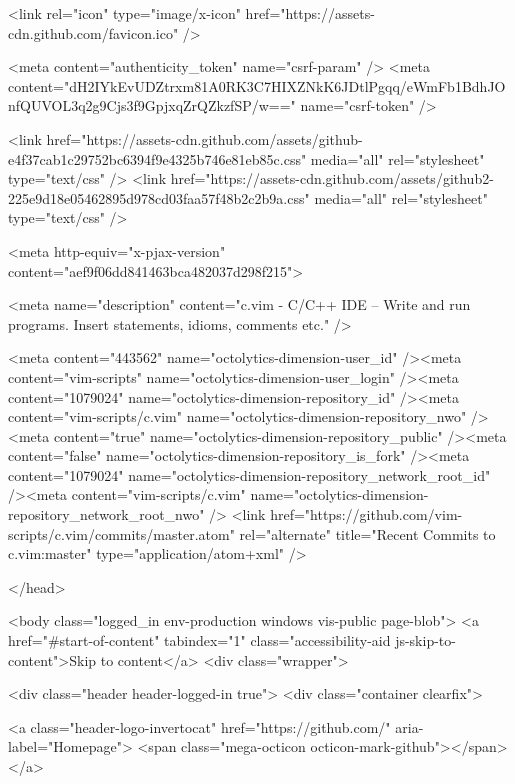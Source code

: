     
    
    <link rel="icon" type="image/x-icon" href="https://assets-cdn.github.com/favicon.ico" />


    <meta content="authenticity_token" name="csrf-param" />
<meta content="dH2IYkEvUDZtrxm81A0RK3C7HIXZNkK6JDtlPgqq/eWmFb1BdhJOnfQUVOL3q2g9Cjs3f9GpjxqZrQZkzfSP/w==" name="csrf-token" />

    <link href="https://assets-cdn.github.com/assets/github-e4f37cab1c29752bc6394f9e4325b746e81eb85c.css" media="all" rel="stylesheet" type="text/css" />
    <link href="https://assets-cdn.github.com/assets/github2-225e9d18e05462895d978cd03faa57f48b2c2b9a.css" media="all" rel="stylesheet" type="text/css" />
    


    <meta http-equiv="x-pjax-version" content="aef9f06dd841463bca482037d298f215">

      
  <meta name="description" content="c.vim - C/C++ IDE --  Write and run programs. Insert statements, idioms, comments etc." />


  <meta content="443562" name="octolytics-dimension-user_id" /><meta content="vim-scripts" name="octolytics-dimension-user_login" /><meta content="1079024" name="octolytics-dimension-repository_id" /><meta content="vim-scripts/c.vim" name="octolytics-dimension-repository_nwo" /><meta content="true" name="octolytics-dimension-repository_public" /><meta content="false" name="octolytics-dimension-repository_is_fork" /><meta content="1079024" name="octolytics-dimension-repository_network_root_id" /><meta content="vim-scripts/c.vim" name="octolytics-dimension-repository_network_root_nwo" />
  <link href="https://github.com/vim-scripts/c.vim/commits/master.atom" rel="alternate" title="Recent Commits to c.vim:master" type="application/atom+xml" />

  </head>


  <body class="logged_in  env-production windows vis-public page-blob">
    <a href="#start-of-content" tabindex="1" class="accessibility-aid js-skip-to-content">Skip to content</a>
    <div class="wrapper">
      
      
      
      


      <div class="header header-logged-in true">
  <div class="container clearfix">

    <a class="header-logo-invertocat" href="https://github.com/" aria-label="Homepage">
  <span class="mega-octicon octicon-mark-github"></span>
</a>


